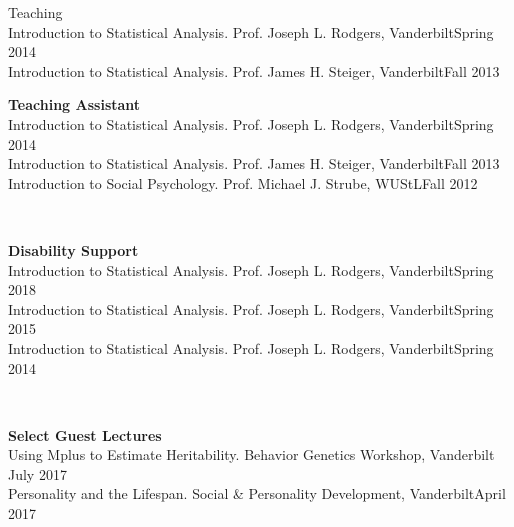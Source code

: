 \begin{rSection}{\textrm{Teaching}}
\\
Introduction to Statistical Analysis. Prof. Joseph L. Rodgers, Vanderbilt\hfill{Spring 2014}
\smallskip\\
Introduction to Statistical Analysis. Prof. James H. Steiger, Vanderbilt\hfill{Fall 2013}%
\medskip\\
\begin{minipage}{\linewidth}{\large {\bf Teaching Assistant}}\\
Introduction to Statistical Analysis. Prof. Joseph L. Rodgers, Vanderbilt\hfill  {Spring 2014}\smallskip\\
Introduction to Statistical Analysis. Prof. James H. Steiger, Vanderbilt\hfill  {Fall 2013}\smallskip\\
Introduction to Social Psychology. Prof. Michael J. Strube, WUStL\hfill{Fall 2012}\end{minipage}\medskip\\
\begin{minipage}{\linewidth}{\large {\bf Disability Support}}\\
Introduction to Statistical Analysis. Prof. Joseph L. Rodgers, Vanderbilt\hfill  {Spring 2018}\smallskip\\
Introduction to Statistical Analysis. Prof. Joseph L. Rodgers, Vanderbilt\hfill  {Spring 2015}\smallskip\\
Introduction to Statistical Analysis. Prof. Joseph L. Rodgers, Vanderbilt\hfill{Spring 2014}\end{minipage}\medskip\\
\begin{minipage}{\linewidth}{\large {\bf Select Guest Lectures}}\\
Using Mplus to Estimate Heritability. Behavior Genetics Workshop, Vanderbilt \hfill{July 2017}\\
Personality and the Lifespan. Social \& Personality Development, Vanderbilt\hfill {April 2017}\end{minipage}
\end{rSection}
